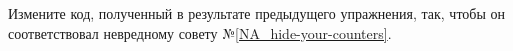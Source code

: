 Измените код, полученный в результате предыдущего упражнения,
так, чтобы он соответствовал невредному совету №\ref{NA_hide-your-counters}.
